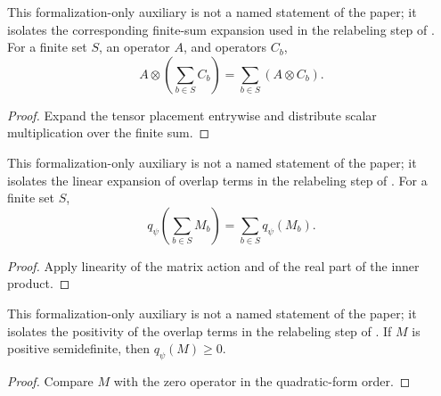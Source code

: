 \begin{lemma}
	\label{lem:distance-tensor-sum-right}
	\leanok
	This formalization-only auxiliary is not a named statement of the paper; it
	isolates the corresponding finite-sum expansion used in the relabeling step
	of \cite[Fact~4.34]{Natarajan2018NEEXP}. For a finite set $S$, an operator $A$, and
	operators $C_b$,
	\[
		A\otimes\left(\sum_{b\in S}C_b\right)
		=\sum_{b\in S}(A\otimes C_b).
	\]
\end{lemma}
\begin{proof}
	\leanok
	Expand the tensor placement entrywise and distribute scalar multiplication
	over the finite sum.
\end{proof}

\begin{lemma}
	\label{lem:distance-qform-finset-sum}
	\leanok
	This formalization-only auxiliary is not a named statement of the paper; it
	isolates the linear expansion of overlap terms in the relabeling step of
	\cite[Fact~4.34]{Natarajan2018NEEXP}. For a finite set $S$,
	\[
		q_\psi\!\left(\sum_{b\in S}M_b\right)
		=\sum_{b\in S}q_\psi(M_b).
	\]
\end{lemma}
\begin{proof}
	\leanok
	Apply linearity of the matrix action and of the real part of the inner
	product.
\end{proof}

\begin{lemma}
	\label{lem:distance-qform-nonnegative}
	\leanok
	This formalization-only auxiliary is not a named statement of the paper; it
	isolates the positivity of the overlap terms in the relabeling step of
	\cite[Fact~4.34]{Natarajan2018NEEXP}. If $M$ is positive semidefinite, then
	$q_\psi(M)\geq 0$.
\end{lemma}
\begin{proof}
	\leanok
	Compare $M$ with the zero operator in the quadratic-form order.
\end{proof}

